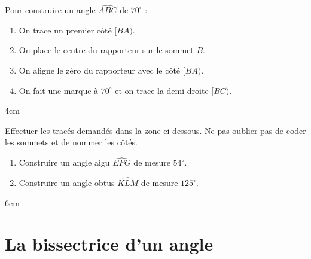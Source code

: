 \documentclass[a4paper]{book}
\begin{document}
    
    \begin{methode}
        Pour construire un angle $\widehat{ABC}$ de $70^{\circ}$ :
        \begin{enumerate}
            \item On trace un premier côté $[BA)$.
            \item On place le centre du rapporteur sur le sommet $B$.
            \item On aligne le zéro du rapporteur avec le côté $[BA)$.
            \item On fait une marque à $70^{\circ}$ et on trace la demi-droite $[BC)$.
        \end{enumerate}
    \end{methode}
    
    \begin{ZoneReponse}{4cm}
    \end{ZoneReponse}


    \begin{exemple}
        Effectuer les tracés demandés dans la zone ci-dessous. Ne pas oublier pas de coder les sommets et de nommer les côtés.
        
        \begin{enumerate}[leftmargin=*]
            \item Construire un angle aigu $\widehat{EFG}$ de mesure $54^{\circ}$.
            \item Construire un angle obtus $\widehat{KLM}$ de mesure $125^{\circ}$.  
        \end{enumerate}
        
        \begin{ZoneReponse}{6cm}
        \end{ZoneReponse}
    \end{exemple}


\section{La bissectrice d'un angle}
\end{document}
